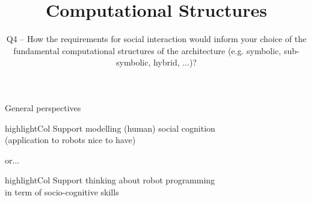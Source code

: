 \documentclass[compress]{beamer}
\title{Computational Structures}
\subtitle{Q4 -- How the requirements for social interaction would inform your
choice of the fundamental computational structures of the architecture (e.g.
symbolic, sub-symbolic, hybrid, ...)?}
\date{}
\author{}
\institute{\texttt{[image: plymouth-logo]}}
\newcommand{\highlight}[1]{%
    \begin{beamercolorbox}[wd=\linewidth,dp=0.7ex]{highlightCol}%
    #1%
    \end{beamercolorbox}%
}%
\begin{document}
\maketitle

\begin{frame}{General perspectives}

    \highlight{\centering Support modelling (human) social cognition\\\scriptsize(application to robots nice to have)}

        \vspace{2em}
        or...\\
        \vspace{1em}

        \highlight{\centering Support thinking about robot programming \\in term of socio-cognitive skills}

\end{frame}
\end{document}
